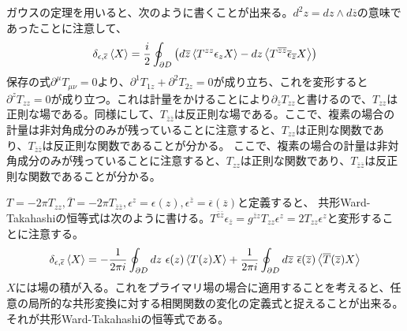 \documentclass[11pt, dvipdfmx]{article}
\numberwithin{equation}{section}
\newcommand{\blankline}{\par\vspace{\baselineskip}} %
\begin{document}
ガウスの定理を用いると、次のように書くことが出来る。$d^2z=dz\wedge d\overline{z}$の意味であったことに注意して、
\begin{align}
   \delta_{\epsilon,\overline{\epsilon}}\ev{X}=\frac{i}{2}\oint_{\partial D} \qty(d\overline{z} \ev{T^{zz}\epsilon_zX}-dz \ev{T^{\overline{z}\overline{z}}\overline{\epsilon}_{\overline{z}}X})
\end{align}
保存の式$\partial^\mu T_{\mu\nu}=0$より、$\partial^1T_{1z}+\partial^2T_{2z}=0$が成り立ち、これを変形すると$\partial^zT_{zz}=0$が成り立つ。これは計量をかけることにより$\partial_{\bar{z}}T_{zz}$と書けるので、$T_{zz}$は正則な場である。同様にして、$T_{\bar{z}\bar{z}}$は反正則な場である。ここで、複素の場合の計量は非対角成分のみが残っていることに注意すると、$T_{zz}$は正則な関数であり、$T_{\overline{z}\overline{z}}$は反正則な関数であることが分かる。
ここで、複素の場合の計量は非対角成分のみが残っていることに注意すると、$T_{zz}$は正則な関数であり、$T_{\overline{z}\overline{z}}$は反正則な関数であることが分かる。
\blankline
$T=-2\pi T_{zz},\overline{T}=-2\pi T_{\overline{z}\overline{z}},\epsilon^z=\epsilon(z),\epsilon^{\overline{z}}=\overline{\epsilon}(\overline{z})$と定義すると、
共形Ward-Takahashiの恒等式は次のように書ける。$T^{\bar{z}\bar{z}}\epsilon_{\overline{z}}=g^{\bar{z}z}T_{zz}\epsilon^z=2T_{zz}\epsilon^z$と変形することに注意する。
\begin{align}
    \delta_{\epsilon,\overline{\epsilon}}\ev{X}=-\frac{1}{2\pi i}\oint_{\partial D} dz \ \epsilon(z) \ev{T(z)X} + \frac{1}{2\pi i}\oint_{\partial D} d\overline{z} \ \overline{\epsilon}(\overline{z}) \ev{\overline{T}(\overline{z})X}\label{conformal Ward takahashi}
\end{align}
$X$には場の積が入る。これをプライマリ場の場合に適用することを考えると、任意の局所的な共形変換に対する相関関数の変化の定義式と捉えることが出来る。それが共形Ward-Takahashiの恒等式である。
\blankline
\end{document}
